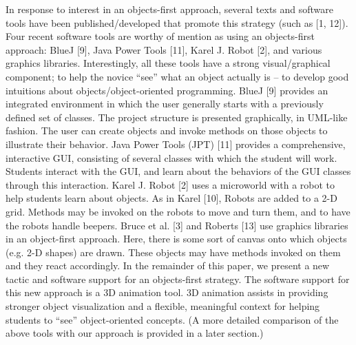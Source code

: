 In response to interest in an objects-first approach, several
texts and software tools have been published/developed that
promote this strategy (such as [1, 12]). Four recent software
tools are worthy of mention as using an objects-first
approach: BlueJ [9], Java Power Tools [11], Karel J. Robot
[2], and various graphics libraries. Interestingly, all these
tools have a strong visual/graphical component; to help the
novice “see” what an object actually is – to develop good
intuitions about objects/object-oriented programming.
BlueJ [9] provides an integrated environment in
which the user generally starts with a previously defined set
of classes. The project structure is presented graphically, in
UML-like fashion. The user can create objects and invoke
methods on those objects to illustrate their behavior. Java
Power Tools (JPT) [11] provides a comprehensive,
interactive GUI, consisting of several classes with which 
the student will work. Students interact with the GUI, and
learn about the behaviors of the GUI classes through this
interaction. Karel J. Robot [2] uses a microworld with a
robot to help students learn about objects. As in Karel [10],
Robots are added to a 2-D grid. Methods may be invoked
on the robots to move and turn them, and to have the robots
handle beepers. Bruce et al. [3] and Roberts [13] use
graphics libraries in an object-first approach. Here, there is
some sort of canvas onto which objects (e.g. 2-D shapes)
are drawn. These objects may have methods invoked on
them and they react accordingly.
In the remainder of this paper, we present a new
tactic and software support for an objects-first strategy. The
software support for this new approach is a 3D animation
tool. 3D animation assists in providing stronger object
visualization and a flexible, meaningful context for helping
students to “see” object-oriented concepts. (A more detailed
comparison of the above tools with our approach is
provided in a later section.) 
